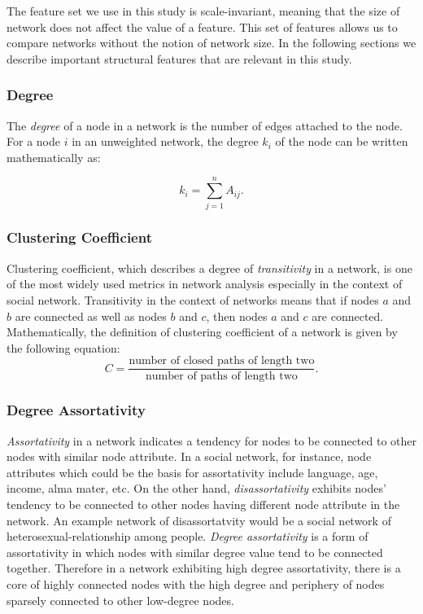 \documentclass{article}
\begin{document}
	The feature set we use in this study is scale-invariant, meaning that the size of network does not affect the value of a feature. This set of features allows us to compare networks without the notion of network size. In the following sections we describe important structural features that are relevant in this study.	
	 
	\subsubsection{Degree}
	The \textit{degree} of a node in a network is the number of edges attached to the node. For a node $i$ in an unweighted network, the degree $k_i$ of the node can be written mathematically as:
	
	\begin{equation}
 	 k_i = \sum_{j = 1}^n A_{ij}.
	\end{equation}

	
	\subsubsection{Clustering Coefficient}
	Clustering coefficient, which describes a degree of \textit{transitivity} in a network, is one of the most widely used metrics in network analysis especially in the context of social network. Transitivity in the context of networks means that if nodes $a$ and $b$ are connected as well as nodes $b$ and $c$, then nodes $a$ and $c$ are connected. Mathematically, the definition of clustering coefficient of a network is given by the following equation:
	\begin{equation}
	C = \frac{\text{number of closed paths of length two}}{\text{number of paths of length two}}.
	\end{equation}
	
	\subsubsection{Degree Assortativity}
	\textit{Assortativity} in a network indicates a tendency for nodes to be connected to other nodes with similar node attribute. In a social network, for instance, node attributes which could be the basis for assortativity include language, age, income, alma mater, etc. On the other hand, \textit{disassortativity} exhibits nodes' tendency to be connected to other nodes having different node attribute in the network. An example network of disassortatvity would be a social network of heterosexual-relationship among people. 
	\textit{Degree assortativity} is a form of assortativity in which nodes with similar degree value tend to be connected together. Therefore in a network exhibiting high degree assortativity, there is a core of highly connected nodes with the high degree and periphery of nodes sparsely connected to other low-degree nodes.
	
\end{document}
